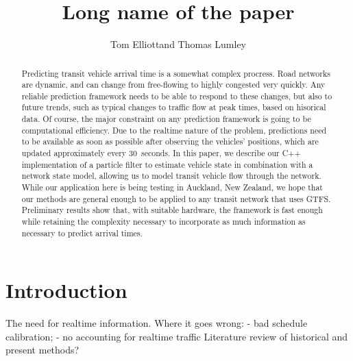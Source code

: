 \documentclass[times, doublespace]{anzsauth}
\begin{document}
\cleanlookdateon
{}
\title{Long name of the paper}
\author{Tom Elliott\corrauth and Thomas Lumley}
\address{
    Department of Statistics, University of Auckland,\\
    Private Bag 92019, Auckland 1142, New Zealand\\
    Email: \texttt{tom.elliott@auckland.ac.nz}
}

\begin{abstract}
Predicting transit vehicle arrival time is a somewhat complex procress.
Road networks are dynamic, and can change from free-flowing to highly congested
very quickly.
Any reliable prediction framework needs to be able to respond to these changes,
but also to future trends, such as typical changes to traffic flow
at peak times, based on hisorical data.
Of course, the major constraint on any prediction framework is going to be
computational efficiency.
Due to the realtime nature of the problem, predictions need to be 
available as soon as possible after observing the vehicles' positions,
which are updated approximately every 30~seconds.
In this paper, we describe our C++ implementation of a particle filter to estimate
vehicle state in combination with a network state model,
allowing us to model transit vehicle flow through the network.
While our application here is being testing in Auckland, New Zealand,
we hope that our methods are general enough to be applied to any
transit network that uses GTFS.
Preliminary results show that, with suitable hardware,
the framework is fast enough while retaining the complexity necessary
to incorporate as much information as necessary to predict arrival times.
\end{abstract}


\maketitle
\section{Introduction}
\label{sec:intro}

The need for realtime information.
Where it goes wrong: 
- bad schedule calibration;
- no accounting for realtime traffic 
Literature review of historical and present methods?
\end{document}
